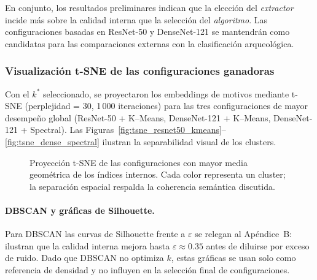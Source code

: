 En conjunto, los resultados preliminares indican que la elección del \emph{extractor} incide más sobre la calidad interna que la selección del \emph{algoritmo}.
Las configuraciones basadas en ResNet-50 y DenseNet-121 se mantendrán como candidatas para las comparaciones externas con la clasificación arqueológica.

\subsubsection{Visualización t-SNE de las configuraciones ganadoras}

Con el $k^\ast$ seleccionado, se proyectaron los embeddings de motivos
mediante t-SNE (perplejidad = 30, 1\,000 iteraciones) para las tres
configuraciones de mayor desempeño global
(ResNet-50 + K–Means, DenseNet-121 + K–Means, DenseNet-121 + Spectral).
Las Figuras~\ref{fig:tsne_resnet50_kmeans}–\ref{fig:tsne_dense_spectral}
ilustran la separabilidad visual de los clusters.

\begin{figure}[ht]
  \centering
  \hfill
  \hfill

  \caption{Proyección t-SNE de las configuraciones con mayor media
    geométrica de los índices internos. Cada color representa un cluster;
    la separación espacial respalda la coherencia semántica discutida.}%
  \label{fig:tsne_best}
\end{figure}

\vspace{1ex}
\paragraph{DBSCAN y gráficas de Silhouette.}
Para DBSCAN las curvas de Silhouette frente a \(\varepsilon\) se relegan al
Apéndice~B: ilustran que la calidad interna mejora hasta
\(\varepsilon\approx0.35\) antes de diluirse por exceso de ruido.
Dado que DBSCAN no optimiza $k$, estas gráficas se usan solo como referencia
de densidad y no influyen en la selección final de configuraciones.

